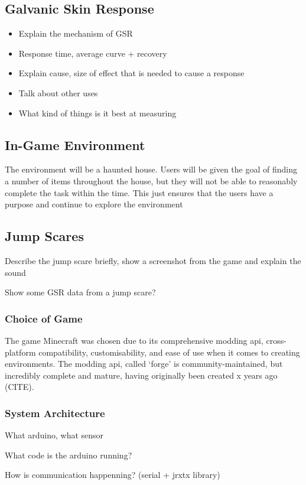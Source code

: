 \documentclass[12pt,a4paper]{article}
\begin{document}
\subsection{Galvanic Skin Response}
\begin{itemize}
	\item Explain the mechanism of GSR
	\item Response time, average curve + recovery
	\item Explain cause, size of effect that is needed to cause a response
	\item Talk about other uses
	\item What kind of things is it best at measuring
\end{itemize}

\subsection{In-Game Environment}
The environment will be a haunted house. Users will be given the goal of finding a number of items throughout the house, but they will not be able to reasonably complete the task within the time. This just ensures that the users have a purpose and continue to explore the environment

\subsection{Jump Scares}
Describe the jump scare briefly, show a screenshot from the game and explain the sound

Show some GSR data from a jump scare?

\subsubsection{Choice of Game}
The game Minecraft was chosen due to its comprehensive modding api, cross-platform compatibility, customisability, and ease of use when it comes to creating environments. The modding api, called `forge' is community-maintained, but incredibly complete and mature, having originally been created x years ago (CITE).

\subsubsection{System Architecture}
What arduino, what sensor

What code is the arduino running?

How is communication happenning? (serial + jrxtx library)
\end{document}
